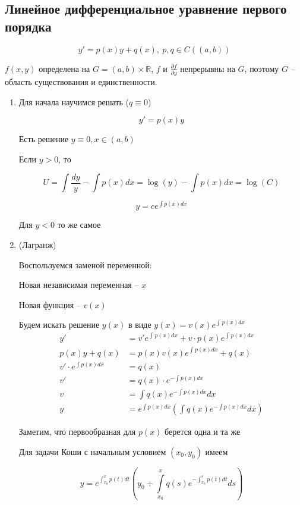\documentclass[a4paper]{article}
\theoremstyle{indented}
\theoremstyle{definition}
\theoremstyle{remark}
\begin{document}
\subsection{Линейное дифференциальное уравнение первого порядка}

\[y' = p(x) y + q(x), \ p,q \in C((a,b))\]

$f(x,y)$ определена на $G = (a,b) \times \mathbb{R} $, $f$ и $\frac{\partial f}{\partial y}$ непрерывны на $G$, поэтому $G$ -- область существования и единственности.


\begin{enumerate}
\item Для начала научимся решать  ($q \equiv 0$)

  \[y' = p(x) y\]

  Есть решение $y \equiv 0, x \in (a,b)$


  Если $y > 0$, то

  \[U = \int \frac{dy}{y} - \int p(x) dx = \log (y) - \int p(x) dx = \log(C)
  \]

  \[y = c e^{\int p(x) dx}\]

  Для $y < 0$ то же самое


\item {} (Лагранж)

  Воспользуемся заменой переменной:

  Новая независимая переменная -- $x$

  Новая функция -- $v(x)$

  Будем искать решение $y(x)$ в виде $y(x) = v(x) e^{\int_{}^{}p(x) dx}$
  \begin{equation*}
    \begin{aligned}
      y'  & = v' e^{\int_{}^{}p(x) dx} + v \cdot p(x) e^{\int_{}^{}p(x) dx} \\
      p(x)y + q(x) & =  p(x) v(x) e^{\int_{}^{}p(x) dx} + q(x) \\
      v' \cdot e^{\int p(x) dx} & = q(x) \\
      v'& = q(x) \cdot e^{-\int p(x) dx} \\
      v  &= \int q(x) e^{-\int p(x) dx} dx \\
      y & = e^{\int p(x) dx} \left( \int q(x) e^{-\int p(x) dx} dx \right)
  \end{aligned}
\end{equation*}

Заметим, что первообразная для $p(x)$ берется одна и та же

Для задачи Коши с начальным условием $(x_0,y_0)$ имеем


\[y  = e^{\int_{x_0}^x p(t) dt} \left( y_0 + \int\limits_{x_0}^x q(s) e^{-\int_{x_0}^s p(t) dt} ds \right)\]

\end{enumerate}
\end{document}
